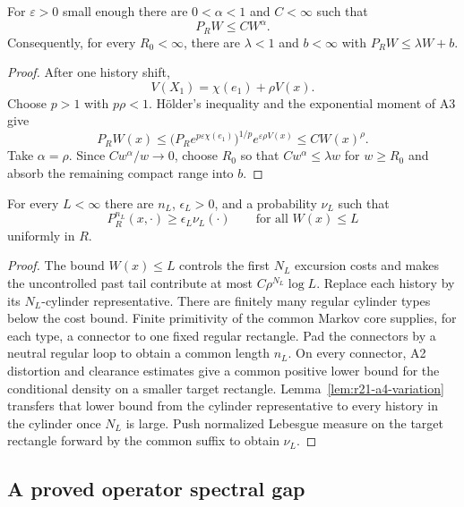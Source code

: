 \begin{lemma}
\label{lem:r21-a4-drift}
For $\varepsilon>0$ small enough there are $0<\alpha<1$ and $C<\infty$ such
that
\[
 P_RW\le C W^\alpha.
\]
Consequently, for every $R_0<\infty$, there are $\lambda<1$ and $b<\infty$
with $P_RW\le\lambda W+b$.
\end{lemma}

\begin{proof}
After one history shift,
\[
 V(X_1)=\chi(e_1)+\rho V(x).
\]
Choose $p>1$ with $p\rho<1$.  H\"older's inequality and the exponential
moment of A3 give
\[
 P_RW(x)\le
 \bigl(P_Re^{p\varepsilon\chi(e_1)}\bigr)^{1/p}
 e^{\varepsilon\rho V(x)}
 \le C W(x)^\rho.
\]
Take $\alpha=\rho$.  Since $Cw^\alpha/w\to0$, choose $R_0$ so that
$Cw^\alpha\le\lambda w$ for $w\ge R_0$ and absorb the remaining compact range
into $b$.
\end{proof}

\begin{lemma}
\label{lem:r21-a4-small}
For every $L<\infty$ there are $n_L$, $\epsilon_L>0$, and a probability
$\nu_L$ such that
\[
 P_R^{n_L}(x,\cdot)\ge\epsilon_L\nu_L(\cdot)
 \qquad\text{for all }W(x)\le L
\]
uniformly in $R$.
\end{lemma}

\begin{proof}
The bound $W(x)\le L$ controls the first $N_L$ excursion costs and makes the
uncontrolled past tail contribute at most $C\rho^{N_L}\log L$.  Replace each
history by its $N_L$-cylinder representative.  There are finitely many
regular cylinder types below the cost bound.  Finite primitivity of the common
Markov core supplies, for each type, a connector to one fixed regular
rectangle.  Pad the connectors by a neutral regular loop to obtain a common
length $n_L$.  On every connector, A2 distortion and clearance estimates give
a common positive lower bound for the conditional density on a smaller target
rectangle.  Lemma~\ref{lem:r21-a4-variation} transfers that lower bound from
the cylinder representative to every history in the cylinder once $N_L$ is
large.  Push normalized Lebesgue measure on the target rectangle forward by
the common suffix to obtain $\nu_L$.
\end{proof}

\subsection{A proved operator spectral gap}

